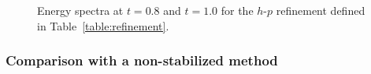 \begin{figure}[h!]
  \centering
  \caption{Energy spectra at $t=0.8$ and $t=1.0$ for the $h$-$p$ refinement defined in Table~\ref{table:refinement}.}
  \label{fig:spec_hp}
\end{figure}

 \subsubsection{Comparison with a non-stabilized method}


